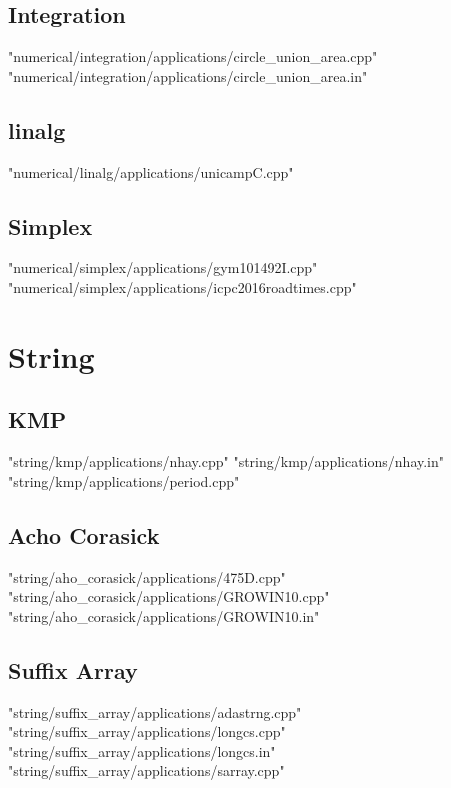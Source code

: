 \documentclass [12pt,onecolumn,oneside]{article}
\begin{document}
\subsection{ Integration}
 {"numerical/integration/applications/circle_union_area.cpp"}
 {"numerical/integration/applications/circle_union_area.in"}
\subsection{ linalg}
 {"numerical/linalg/applications/unicampC.cpp"}
\subsection{ Simplex}
 {"numerical/simplex/applications/gym101492I.cpp"}
 {"numerical/simplex/applications/icpc2016roadtimes.cpp"}
\newpage

\section{String}
\subsection{ KMP}
 {"string/kmp/applications/nhay.cpp"}
 {"string/kmp/applications/nhay.in"}
 {"string/kmp/applications/period.cpp"}
\subsection{ Acho Corasick}
 {"string/aho_corasick/applications/475D.cpp"}
 {"string/aho_corasick/applications/GROWIN10.cpp"}
 {"string/aho_corasick/applications/GROWIN10.in"}
\subsection{ Suffix Array}
 {"string/suffix_array/applications/adastrng.cpp"}
 {"string/suffix_array/applications/longcs.cpp"}
 {"string/suffix_array/applications/longcs.in"}
 {"string/suffix_array/applications/sarray.cpp"}
\newpage
\end{document}
